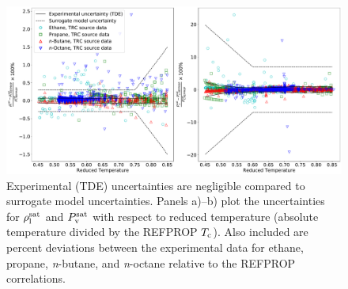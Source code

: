 \documentclass[preprint,letterpaper,floatfix,citeautoscript,aip,jcp]{revtex4-1}
\begin{document}
\begin{figure}[htb!]
	\centering
	\includegraphics[width=6.4in]{Error_model_alkanes}
	\caption{Experimental (TDE) uncertainties are negligible compared to surrogate model uncertainties. Panels a)--b) plot the uncertainties for $\rho_{\rm l}^{\rm sat}$ and $P_{\rm v}^{\rm sat}$ with respect to reduced temperature (absolute temperature divided by the REFPROP $T_{\rm c}$). Also included are percent deviations between the experimental data for ethane, propane, \textit{n}-butane, and \textit{n}-octane relative to the REFPROP correlations.}
	\label{fig:Error_model}
\end{figure} 

\end{document}
